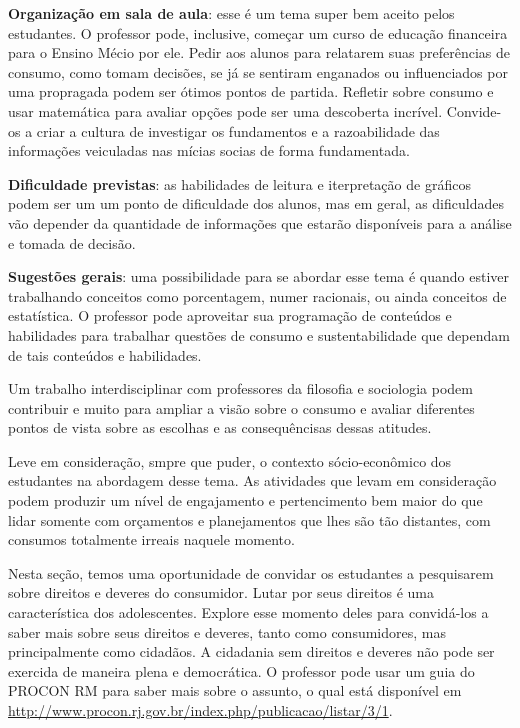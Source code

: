 \begin{paginatexto2}
\textbf{Organização em sala de aula}: esse é um tema super bem aceito pelos estudantes. O professor pode, inclusive, começar um curso de educação financeira para o Ensino Mécio por ele. Pedir aos alunos para relatarem suas preferências de consumo, como tomam decisões, se já se sentiram enganados ou influenciados por uma propragada podem ser ótimos pontos de partida. Refletir sobre consumo e usar matemática para avaliar opções pode ser uma descoberta incrível. Convide-os a criar a cultura de investigar os fundamentos e a razoabilidade das informações veiculadas nas mícias socias de forma fundamentada.

\textbf{Dificuldade previstas}: as habilidades de leitura e iterpretação de gráficos podem ser um um ponto de dificuldade dos alunos, mas em geral, as dificuldades vão depender da quantidade de informações que estarão disponíveis para a análise e tomada de decisão.

\textbf{Sugestões gerais}: uma possibilidade para se abordar esse tema é quando estiver trabalhando conceitos como porcentagem, numer racionais, ou ainda conceitos de estatística. O professor pode aproveitar sua programação de conteúdos e habilidades para trabalhar questões de consumo e sustentabilidade que dependam de tais conteúdos e habilidades.

Um trabalho interdisciplinar com professores da filosofia e sociologia podem contribuir e muito para ampliar a visão sobre o consumo e avaliar diferentes pontos de vista sobre as escolhas e as consequêncisas dessas atitudes.

Leve em consideração, smpre que puder, o contexto sócio-econômico dos estudantes na abordagem desse tema. As atividades que levam em consideração podem produzir um nível de engajamento e pertencimento bem maior do que lidar somente com orçamentos e planejamentos que lhes são tão distantes, com consumos totalmente irreais naquele momento.

Nesta seção, temos uma oportunidade de convidar os estudantes a pesquisarem sobre direitos e deveres do consumidor. Lutar por seus direitos é uma característica dos adolescentes. Explore esse momento deles para convidá-los a saber mais sobre seus direitos e deveres, tanto como consumidores, mas principalmente como cidadãos. A cidadania sem direitos e deveres não pode ser exercida de maneira plena e democrática. O professor pode usar um guia do PROCON RM para saber mais sobre o assunto, o qual está disponível em \url{http://www.procon.rj.gov.br/index.php/publicacao/listar/3/1}.


\end{paginatexto2}
